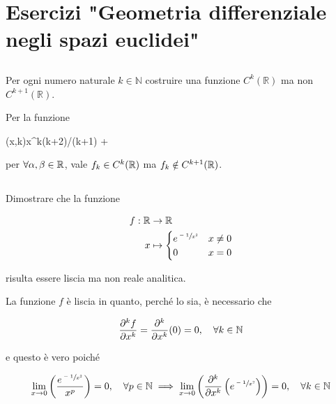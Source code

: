 \chapter{Esercizi "Geometria differenziale negli spazi euclidei"}

\tocless\section{}\label{es1-1}

\begin{tcolorbox}
	Per ogni numero naturale $ k \in \mathbb{N} $ costruire una funzione $ C^{k}(\mathbb{R}) $ ma non $ C^{k+1}(\mathbb{R}) $.
\end{tcolorbox}

Per la funzione

%
	{\R \times \N}{\R}%
	{(x,k)}{\alpha x^{k(k+2)/(k+1)} + \beta}
	
per $ \forall \alpha,\beta \in \mathbb{R} $, vale $ f_{k} \in C^{k}(\mathbb{R}) $ ma $ f_{k} \notin C^{k+1}(\mathbb{R}) $.

\tocless\section{}\label{es1-2}

\begin{tcolorbox}
	Dimostrare che la funzione
	
	\begin{align}
		\begin{split}
			f : \mathbb{R} & \to \mathbb{R}\\
			x &\mapsto%
				\begin{cases}
					e^{\sfrac{-1}{x^{2}}} & x \neq 0\\
					0 & x = 0
				\end{cases}
		\end{split}
	\end{align}
	
	risulta essere liscia ma non reale analitica.
\end{tcolorbox}

La funzione $ f $ è liscia in quanto, perché lo sia, è necessario che

\begin{equation}
	\pdv[k]{f}{x} = \pdv[k]{x} (0) = 0 \qcomma \forall k \in \N
\end{equation}

e questo è vero poiché

\begin{equation}
	\lim_{x \to 0} \left( \dfrac{e^{\sfrac{-1}{x^{2}}}}{x^{p}} \right) = 0 \qcomma \forall p \in \N %
	\implies%
	\lim_{x \to 0} \left( \pdv[k]{x} \left( e^{\sfrac{-1}{x^{2}}} \right) \right) = 0 \qcomma \forall k \in \N
\end{equation}

